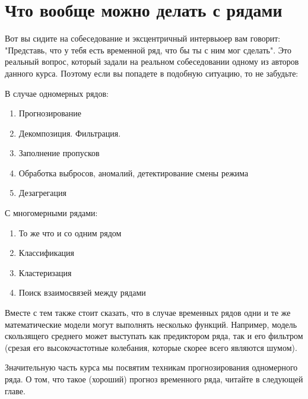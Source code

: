 \section{Что вообще можно делать с рядами}

Вот вы сидите на собеседование и эксцентричный интервьюер вам
говорит: "Представь, что у тебя есть временной ряд, что бы ты с ним
мог сделать". Это реальный вопрос, который задали на реальном
собеседовании одному из авторов данного курса. Поэтому если вы
попадете в подобную ситуацию, то не забудьте:

В случае одномерных рядов:

\begin{enumerate}
  \item Прогнозирование
  \item Декомпозиция. Фильтрация.
  \item Заполнение пропусков
  \item Обработка выбросов, аномалий, детектирование смены режима
  \item Дезагрегация
\end{enumerate}

С многомерными рядами:

\begin{enumerate}
  \item То же что и со одним рядом
  \item Классификация
  \item Кластеризация
  \item Поиск взаимосвязей между рядами
\end{enumerate}

Вместе с тем также стоит сказать, что в случае временных рядов одни и
те же математические модели могут выполнять несколько функций.
Например, модель скользящего среднего может выступать как предиктором
ряда, так и его фильтром (срезая его высокочастотные колебания,
которые скорее всего являются шумом).

Значительную часть курса мы посвятим техникам прогнозирования
одномерного ряда. О том, что такое (хороший) прогноз временного ряда,
читайте в следующей главе.
